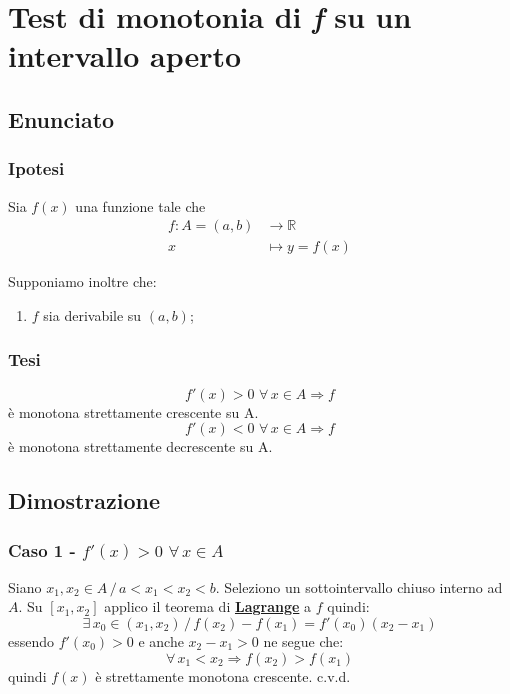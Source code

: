 \documentclass[../dimostrazioni]{subfiles}
\begin{document}
    \chapter{Test di monotonia di \textit{f} su un intervallo aperto}

        \section*{Enunciato}

        \subsection*{Ipotesi}

            Sia \(f(x)\) una funzione tale che
            \begin{align*}
                f : A = (a, b) &\longrightarrow \mathbb{R}\\
                x &\longmapsto y = f(x) 
            \end{align*}

            Supponiamo inoltre che:

            \begin{enumerate}
                \indentitem \item \(f\) sia derivabile su \((a, b)\);
            \end{enumerate}

        \subsection*{Tesi}

            \[ f'(x) > 0 \, \, \forall \, x \in A \Rightarrow f \] è monotona strettamente crescente su A. 
            \[ f'(x) < 0 \, \, \forall \, x \in A \Rightarrow f \] è monotona strettamente decrescente su A.

        \section*{Dimostrazione}

            \medskip

            \subsection*{Caso 1 - \( f'(x) > 0 \, \, \forall \, x \in A \)}

            Siano \(x_1, x_2 \in A \, / \, a < x_1 < x_2 < b \). Seleziono un sottointervallo chiuso interno ad \(A\).
            Su \( [x_1, x_2] \) applico il teorema di \textbf{\hyperref[teoLagrange]{Lagrange}} a \(f\) quindi:
            \[
                \exists \, x_0 \in (x_1, x_2) \, / \, f(x_2) - f(x_1) = f'(x_0)(x_2 - x_1) 
            \]
            essendo \( f'(x_0) > 0 \) e anche \( x_2 - x_1 > 0 \) ne segue che:
            \[
                \forall \, x_1 < x_2 \Rightarrow f(x_2) > f(x_1)
            \]
            quindi \(f(x)\) è strettamente monotona crescente. c.v.d.
\end{document}
